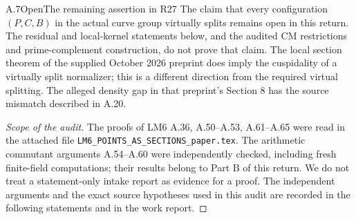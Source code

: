 \begin{statement}{A.7}{Open}{The remaining assertion in R27}
The claim that every configuration $(P,C,B)$ in the actual curve
group virtually splits remains open in this return. The residual
and local-kernel statements below, and the audited CM restrictions
and prime-complement construction, do not prove that claim.
The local section theorem of the supplied October 2026 preprint
does imply the cuspidality of a virtually split normalizer; this
is a different direction from the required virtual splitting.
The alleged density gap in that preprint's Section 8 has the
source mismatch described in A.20.
\end{statement}
\begin{proof}[Scope of the audit]
The proofs of LM6 A.36, A.50--A.53, A.61--A.65 were read in the
attached file \texttt{LM6\_POINTS\_AS\_SECTIONS\_paper.tex}.
The arithmetic commutant arguments A.54--A.60 were independently
checked, including fresh finite-field computations; their results
belong to Part B of this return. We do not treat a statement-only
intake report as evidence for a proof. The independent arguments
and the exact source hypotheses used in this audit are recorded
in the following statements and in the work report.
\end{proof}

